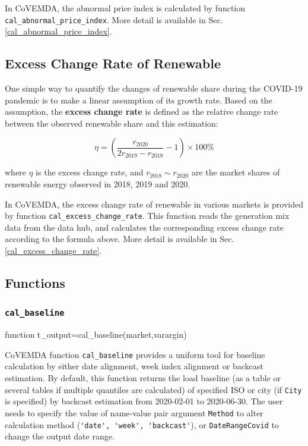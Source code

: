 \documentclass[10pt]{article}
\newcommand{\covemda}{CoVEMDA}
\numberwithin{equation}{section}
\numberwithin{table}{section}
\numberwithin{figure}{section}
\begin{document}
In \covemda{}, the abnormal price index is calculated by function \verb!cal_abnormal_price_index!. More detail is available in Sec.\ref{cal_abnormal_price_index}.



\subsection{Excess Change Rate of Renewable}\label{subsec:excess_change_rate}

One simple way to quantify the changes of renewable share during the COVID-19 pandemic is to make a linear assumption of its growth rate. Based on the assumption, the \textbf{excess change rate} is defined as the relative change rate between the observed renewable share and this estimation:

\begin{equation*}
    \eta=\left(\frac{r_{2020}}{2r_{2019}-r_{2018}}-1\right)\times100\%
\end{equation*}

where $\eta$ is the excess change rate, and $r_{2018}\sim r_{2020}$ are the market shares of renewable energy observed in 2018, 2019 and 2020.

In \covemda{}, the excess change rate of renewable in various markets is provided by function \verb!cal_excess_change_rate!. This function reads the generation mix data from the data hub, and calculates the corresponding excess change rate according to the formula above. More detail is available in Sec.\ref{cal_excess_change_rate}.



\subsection{Functions}

\subsubsection{\texttt{cal\_baseline}}\label{func:cal_baseline}

\begin{Code}
function t_output=cal_baseline(market,varargin)
\end{Code}

\covemda{} function \verb!cal_baseline! provides a uniform tool for baseline calculation by either date alignment, week index alignment or backcast estimation. By default, this function returns the load baseline (as a table or several tables if multiple quantiles are calculated) of specified ISO or city (if \verb!City! is specified) by backcast estimation from 2020-02-01 to 2020-06-30. The user needs to specify the value of name-value pair argument \verb!Method! to alter calculation method (\verb!'date', 'week', 'backcast'!), or \verb!DateRangeCovid! to change the output date range.
\end{document}
